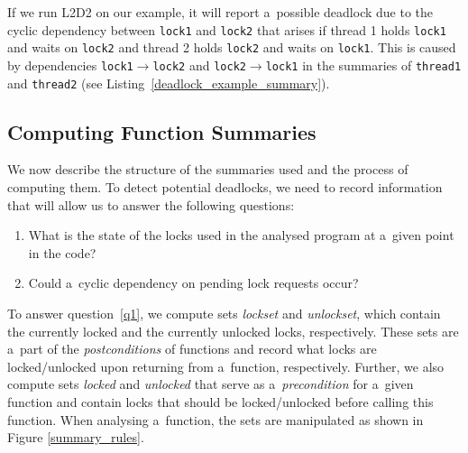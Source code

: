 \documentclass{ExcelAtFIT}
\begin{document}
If we run L2D2 on our example, it will report a~possible deadlock due to the cyclic dependency between \texttt{lock1} and \texttt{lock2} that arises if thread 1 holds \texttt{lock1} and waits on \texttt{lock2} and thread 2 holds \texttt{lock2} and waits on \texttt{lock1}. This is caused by dependencies \texttt{lock1$\rightarrow$lock2} and \texttt{lock2$\rightarrow$lock1} in the summaries of \texttt{thread1} and \texttt{thread2}
(see Listing~\ref{deadlock_example_summary}).

\subsection{Computing Function Summaries}
\label{summ_computation}
We now describe the structure of the summaries used and the process of computing them. To detect potential deadlocks, we need to record information that will allow us to answer the following questions:
\begin{enumerate}[label={(\arabic*)}, topsep=0.4em]
    \item \label{q1} What is the state of the locks used in the analysed program at a~given point in the code?
    \item \label{q2} Could a~cyclic dependency on pending lock requests occur?
\end{enumerate}

To answer question~\ref{q1}, we compute sets \textit{lockset} and \textit{unlockset}, which contain the currently locked and the currently unlocked locks, respectively. These sets are a~part of the \textit{postconditions} of functions and record what locks are locked/unlocked upon returning from a~function, respectively. Further, we also compute sets \textit{locked} and \textit{unlocked} that serve as a~\textit{precondition} for a~given function and contain locks that should be locked/unlocked before calling this function.
When analysing a~function, the sets are manipulated as shown in Figure \ref{summary_rules}.
\end{document}
